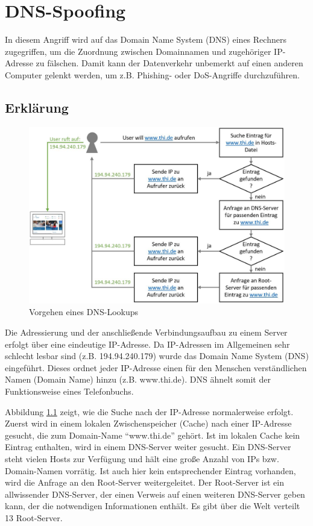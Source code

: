 \chapter{DNS-Spoofing}
In diesem Angriff wird auf das Domain Name System (DNS) eines Rechners zugegriffen, um die Zuordnung zwischen Domainnamen und zugehöriger IP-Adresse zu fälschen. Damit kann der Datenverkehr unbemerkt auf einen anderen Computer gelenkt werden, um z.B. Phishing- oder DoS-Angriffe durchzuführen.

\section{Erklärung}
\begin{figure}[H]
	\centering
	\includegraphics[width=\textwidth]{images/DNS_Spoofing/normal_dns_lookup.jpg}
	\caption{Vorgehen eines DNS-Lookups}
	\label{fig:normal_dns_lookup}
\end{figure}

Die Adressierung und der anschließende Verbindungsaufbau zu einem Server erfolgt über eine eindeutige IP-Adresse. Da IP-Adressen im Allgemeinen sehr schlecht lesbar sind (z.B. 194.94.240.179) wurde das Domain Name System (DNS) eingeführt. Dieses ordnet jeder IP-Adresse einen für den Menschen verständlichen Namen (Domain Name) hinzu (z.B. www.thi.de). DNS ähnelt somit der Funktionsweise eines Telefonbuchs.

Abbildung \ref{fig:normal_dns_lookup} zeigt, wie die Suche nach der IP-Adresse normalerweise erfolgt. Zuerst wird in einem lokalen Zwischenspeicher (Cache) nach einer IP-Adresse gesucht, die zum Domain-Name \enquote{www.thi.de} gehört. Ist im lokalen Cache kein Eintrag enthalten, wird in einem DNS-Server weiter gesucht. Ein DNS-Server steht vielen Hosts zur Verfügung und hält eine große Anzahl von IPs bzw. Domain-Namen vorrätig. Ist auch hier kein entsprechender Eintrag vorhanden, wird die Anfrage an den Root-Server weitergeleitet. Der Root-Server ist ein allwissender DNS-Server, der einen Verweis auf einen weiteren DNS-Server geben kann, der die notwendigen Informationen enthält. Es gibt über die Welt verteilt 13 Root-Server.

